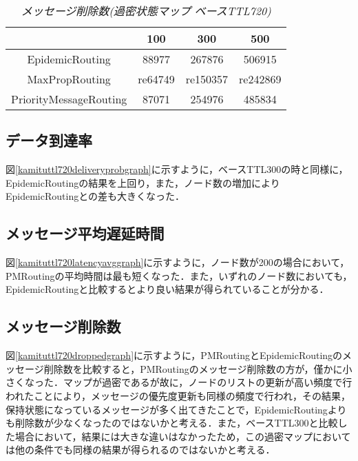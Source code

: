 \documentclass[11pt]{icsthesis}
\begin{document}
\begin{table}[H]
 \begin{center}
      \caption[]{\it{メッセージ削除数(過密状態マップ ベースTTL720)}}
      \label{kamituttl720dropped}
      \begin{tabular}{|c|c|c|c|}
\hline
&100&300&500\\
\hline
EpidemicRouting&88977&267876&506915\\
\hline
MaxPropRouting&re64749&re150357&re242869\\
\hline
PriorityMessageRouting&87071&254976&485834\\
\hline
      \end{tabular}
    \end{center}
\end{table}
\subsection{データ到達率}
図\ref{kamituttl720deliveryprobgraph}に示すように，ベースTTL300の時と同様に，EpidemicRoutingの結果を上回り，また，ノード数の増加によりEpidemicRoutingとの差も大きくなった．

\subsection{メッセージ平均遅延時間}
図\ref{kamituttl720latencyavggraph}に示すように，ノード数が200の場合において，PMRoutingの平均時間は最も短くなった．また，いずれのノード数においても，EpidemicRoutingと比較するとより良い結果が得られていることが分かる．

\subsection{メッセージ削除数}
図\ref{kamituttl720droppedgraph}に示すように，PMRoutingとEpidemicRoutingのメッセージ削除数を比較すると，PMRoutingのメッセージ削除数の方が，僅かに小さくなった．マップが過密であるが故に，ノードのリストの更新が高い頻度で行われたことにより，メッセージの優先度更新も同様の頻度で行われ，その結果，保持状態になっているメッセージが多く出てきたことで，EpidemicRoutingよりも削除数が少なくなったのではないかと考える．また，ベースTTL300と比較した場合において，結果には大きな違いはなかったため，この過密マップにおいては他の条件でも同様の結果が得られるのではないかと考える．
\end{document}

